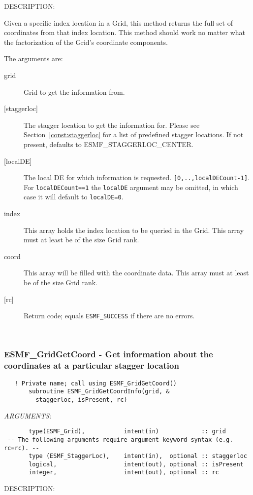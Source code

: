 {\sf DESCRIPTION:\\ }


       Given a specific index location in a Grid, this method returns the full set
     of coordinates from that index location. This method should work no matter what
     the factorization of the Grid's coordinate components.
  
       The arguments are:
       \begin{description}
       \item[grid]
            Grid to get the information from.
       \item[{[staggerloc]}]
            The stagger location to get the information for.
            Please see Section~\ref{const:staggerloc} for a list
            of predefined stagger locations. If not present, defaults to
            ESMF\_STAGGERLOC\_CENTER.
       \item[{[localDE]}]
            The local DE for which information is requested. {\tt [0,..,localDECount-1]}.
            For {\tt localDECount==1} the {\tt localDE} argument may be omitted,
            in which case it will default to {\tt localDE=0}.
       \item[index]
            This array holds the index location to be queried in the Grid. This array must
            at least be of the size Grid rank.
       \item[coord]
            This array will be filled with the coordinate data. This array must
            at least be of the size Grid rank.
       \item[{[rc]}]
            Return code; equals {\tt ESMF\_SUCCESS} if there are no errors.
     \end{description}
   
 
\mbox{}\hrulefill\ 
 

  \label{API:GridGetCoordInfo}\subsubsection [ESMF\_GridGetCoord] {ESMF\_GridGetCoord - Get information about the coordinates at a particular stagger location}


 
\begin{verbatim}   ! Private name; call using ESMF_GridGetCoord()
       subroutine ESMF_GridGetCoordInfo(grid, &
         staggerloc, isPresent, rc)\end{verbatim}{\em ARGUMENTS:}
\begin{verbatim}       type(ESMF_Grid),           intent(in)            :: grid
 -- The following arguments require argument keyword syntax (e.g. rc=rc). --
       type (ESMF_StaggerLoc),    intent(in),  optional :: staggerloc
       logical,                   intent(out), optional :: isPresent
       integer,                   intent(out), optional :: rc\end{verbatim}
{\sf DESCRIPTION:\\ }


